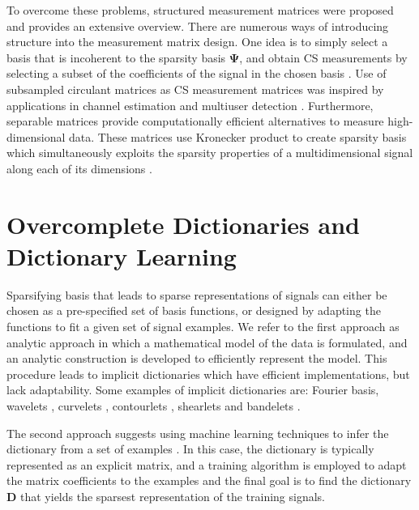 \documentclass[journal]{IEEEtran}
\begin{document}
To overcome these problems, structured measurement matrices were proposed and \cite{Li2015} provides an extensive overview. There are numerous ways of introducing structure into the measurement matrix design. One idea is to simply select a basis that is incoherent to the sparsity basis $\boldsymbol{\Psi}$, and obtain CS measurements by selecting a subset of the coefficients of the signal in the chosen basis \cite{Candes2007}. Use of subsampled circulant matrices as CS measurement matrices was inspired by applications in channel estimation and multiuser detection \cite{bajwa2007toeplitz, haupt2010toeplitz, yinpractical}. Furthermore, separable matrices provide computationally efficient alternatives to measure high-dimensional data. These matrices use Kronecker product \cite{schacke2013kronecker} to create sparsity basis which simultaneously exploits the sparsity properties of a multidimensional signal along each of its dimensions \cite{Rivenson2009, Duarte2012}.  

\section{Overcomplete Dictionaries and Dictionary Learning} \label{sec:3}

Sparsifying basis that leads to sparse representations of signals can either be chosen as a pre-specified set of basis functions, or designed by adapting the functions to fit a given set of signal examples. We refer to the first approach as analytic approach in which a mathematical model of the data is formulated, and an analytic construction is developed to efficiently represent the model. This procedure leads to implicit dictionaries which have efficient implementations, but lack adaptability. Some examples of implicit dictionaries are: Fourier basis, wavelets \cite{daubechies1992ten}, curvelets \cite{starck2002curvelet}, contourlets \cite{do2002contourlets}, shearlets \cite{guo2007optimally} and bandelets \cite{le2005sparse}. 

The second approach suggests using machine learning techniques to infer the dictionary from a set of examples \cite{olshausen1996emergence, Petrov2012, Rubinstein, Christen2010}. In this case, the dictionary is typically represented as an explicit matrix, and a training algorithm is employed to adapt the matrix coefficients to the examples and the final goal is to find the dictionary $\boldsymbol{D}$ that yields the sparsest representation of the training signals. 
\end{document}
